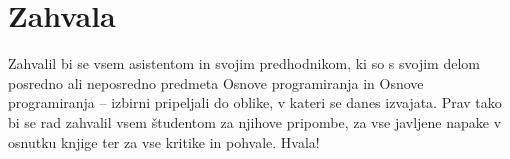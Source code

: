 \chapter*{Zahvala}

Zahvalil bi se vsem asistentom in svojim predhodnikom, ki so s svojim delom posredno ali neposredno predmeta Osnove programiranja in Osnove programiranja -- izbirni pripeljali do oblike, v kateri se danes izvajata. Prav tako bi se rad zahvalil vsem študentom za njihove pripombe, za vse javljene napake v osnutku knjige ter za vse kritike in pohvale. Hvala!


